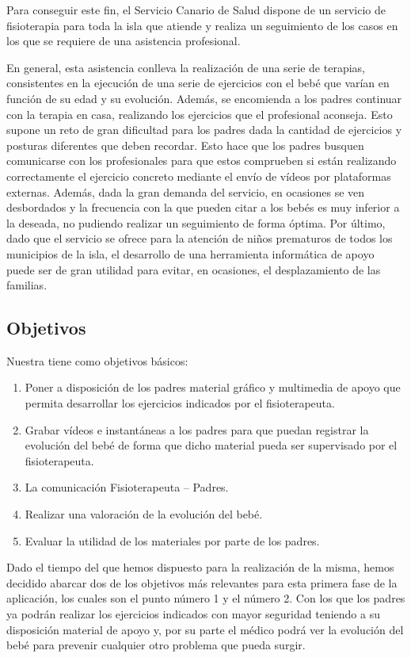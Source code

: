 Para conseguir este fin, el Servicio Canario de Salud dispone de un servicio de fisioterapia para toda la isla que atiende y realiza un seguimiento de los casos en los que se requiere de una asistencia profesional.

En general, esta asistencia conlleva la realización de una serie de terapias, consistentes en la ejecución de una serie de ejercicios con el bebé que varían en función de su edad y su evolución. Además, se encomienda a los padres continuar con la terapia en casa, realizando los ejercicios que el profesional aconseja. Esto supone un reto de gran dificultad para los padres dada la cantidad de ejercicios y posturas diferentes que deben recordar. Esto hace que los padres busquen comunicarse con los profesionales para que estos comprueben si están realizando correctamente el ejercicio concreto mediante el envío de vídeos por plataformas externas. Además, dada la gran demanda del servicio, en ocasiones se ven desbordados y la frecuencia con la que pueden citar a los bebés es muy inferior a la deseada, no pudiendo realizar un seguimiento de forma óptima. Por último, dado que el servicio se ofrece para la atención de niños prematuros de todos los municipios de la isla, el desarrollo de una herramienta informática de apoyo puede ser de gran utilidad para evitar, en ocasiones, el desplazamiento de las familias.

\bigskip
\subsection{Objetivos}
Nuestra \textbf{\myTitle} tiene como objetivos básicos:
 \begin{enumerate}
\item Poner a disposición de los padres material gráfico y multimedia de apoyo que permita desarrollar los ejercicios indicados por el fisioterapeuta. 
\item Grabar vídeos e instantáneas a los padres para que puedan registrar la evolución del bebé de forma que dicho material pueda ser supervisado por el fisioterapeuta.
\item La comunicación Fisioterapeuta – Padres.
\item Realizar una valoración de la evolución del bebé.
\item Evaluar la utilidad de los materiales por parte de los padres.
\end{enumerate}

Dado el tiempo del que hemos dispuesto para la realización de la misma, hemos decidido abarcar dos de los objetivos más relevantes para esta primera fase de la aplicación, los cuales son el punto número 1 y el número 2. Con los que los padres ya podrán realizar los ejercicios indicados con mayor seguridad teniendo a su disposición material de apoyo y, por su parte el médico podrá ver la evolución del bebé para prevenir cualquier otro problema que pueda surgir.
